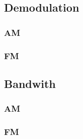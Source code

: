\subsection{Demodulation}

\subsubsection*{AM}

\subsubsection*{FM}

\subsection{Bandwith}

\subsubsection*{AM}

\subsubsection*{FM}
